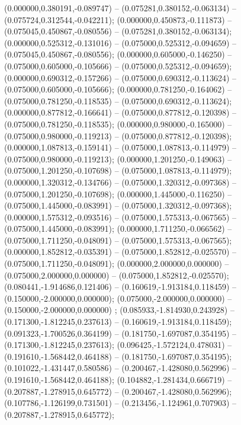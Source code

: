  (0.000000,0.380191,-0.089747) -- (0.075281,0.380152,-0.063134) -- (0.075724,0.312544,-0.042211);
 (0.000000,0.450873,-0.111873) -- (0.075045,0.450867,-0.080556) -- (0.075281,0.380152,-0.063134);
 (0.000000,0.525312,-0.131016) -- (0.075000,0.525312,-0.094659) -- (0.075045,0.450867,-0.080556);
 (0.000000,0.605000,-0.146250) -- (0.075000,0.605000,-0.105666) -- (0.075000,0.525312,-0.094659);
 (0.000000,0.690312,-0.157266) -- (0.075000,0.690312,-0.113624) -- (0.075000,0.605000,-0.105666);
 (0.000000,0.781250,-0.164062) -- (0.075000,0.781250,-0.118535) -- (0.075000,0.690312,-0.113624);
 (0.000000,0.877812,-0.166641) -- (0.075000,0.877812,-0.120398) -- (0.075000,0.781250,-0.118535);
 (0.000000,0.980000,-0.165000) -- (0.075000,0.980000,-0.119213) -- (0.075000,0.877812,-0.120398);
 (0.000000,1.087813,-0.159141) -- (0.075000,1.087813,-0.114979) -- (0.075000,0.980000,-0.119213);
 (0.000000,1.201250,-0.149063) -- (0.075000,1.201250,-0.107698) -- (0.075000,1.087813,-0.114979);
 (0.000000,1.320312,-0.134766) -- (0.075000,1.320312,-0.097368) -- (0.075000,1.201250,-0.107698);
 (0.000000,1.445000,-0.116250) -- (0.075000,1.445000,-0.083991) -- (0.075000,1.320312,-0.097368);
 (0.000000,1.575312,-0.093516) -- (0.075000,1.575313,-0.067565) -- (0.075000,1.445000,-0.083991);
 (0.000000,1.711250,-0.066562) -- (0.075000,1.711250,-0.048091) -- (0.075000,1.575313,-0.067565);
 (0.000000,1.852812,-0.035391) -- (0.075000,1.852812,-0.025570) -- (0.075000,1.711250,-0.048091);
 (0.000000,2.000000,0.000000) -- (0.075000,2.000000,0.000000) -- (0.075000,1.852812,-0.025570);
 (0.080441,-1.914686,0.121406) -- (0.160619,-1.913184,0.118459) -- (0.150000,-2.000000,0.000000);
 (0.075000,-2.000000,0.000000) -- (0.150000,-2.000000,0.000000) ;
 (0.085933,-1.814930,0.243928) -- (0.171300,-1.812245,0.237613) -- (0.160619,-1.913184,0.118459);
 (0.091323,-1.700526,0.364199) -- (0.181750,-1.697087,0.354195) -- (0.171300,-1.812245,0.237613);
 (0.096425,-1.572124,0.478031) -- (0.191610,-1.568442,0.464188) -- (0.181750,-1.697087,0.354195);
 (0.101022,-1.431447,0.580586) -- (0.200467,-1.428080,0.562996) -- (0.191610,-1.568442,0.464188);
 (0.104882,-1.281434,0.666719) -- (0.207887,-1.278915,0.645772) -- (0.200467,-1.428080,0.562996);
 (0.107786,-1.126199,0.731501) -- (0.213456,-1.124961,0.707903) -- (0.207887,-1.278915,0.645772);
